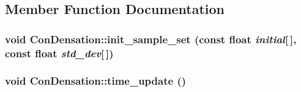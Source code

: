 \subsection{Member Function Documentation}
\hypertarget{classConDensation_aa61120a09e253fe429ee6a912f856fd5}{
\subsubsection[{init\_\-sample\_\-set}]{\setlength{\rightskip}{0pt plus 5cm}void ConDensation::init\_\-sample\_\-set (const float {\em initial}\mbox{[}$\,$\mbox{]}, \/  const float {\em std\_\-dev}\mbox{[}$\,$\mbox{]})}}
\label{classConDensation_aa61120a09e253fe429ee6a912f856fd5}
\hypertarget{classConDensation_a5aef436b8879d0e97b4503b609678740}{
\subsubsection[{time\_\-update}]{\setlength{\rightskip}{0pt plus 5cm}void ConDensation::time\_\-update ()}}
\label{classConDensation_a5aef436b8879d0e97b4503b609678740}


